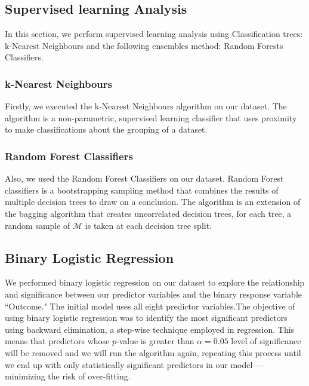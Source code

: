 \documentclass[12pt]{article}
\begin{document}
\subsection{Supervised learning Analysis} 
 In this section, we perform supervised learning analysis using Classification trees: k-Nearest Neighbours and the following ensembles method: Random Forests Classifiers.\cite{zhou2012ensemble}
 
 \subsubsection{k-Nearest Neighbours}

 Firstly, we executed the k-Nearest Neighbours algorithm \cite{peterson2009k} on our dataset. The algorithm is a non-parametric, supervised learning classifier that uses proximity to make classifications about the grouping of a dataset.

 \subsubsection{Random Forest Classifiers}
 
 Also, we used the Random Forest Classifiers \cite{zhou2012ensemble} on our dataset. Random Forest classifiers is a bootstrapping sampling method that combines the results of multiple decision trees to draw on a conclusion. The algorithm \cite{Lecture16} is an extension of the bagging algorithm \cite{Lecture16} that creates uncorrelated decision trees, for each tree, a random sample of $\mathcal{M}$ is taken at each decision tree split.

\subsection{Binary Logistic Regression}

\begin{indent}
	

We performed binary logistic regression \cite{faraway2016extending} on our dataset to explore the relationship and significance between our predictor variables and the binary response variable “Outcome." The initial model uses all eight predictor variables.The objective of using binary logistic regression was to identify the most significant predictors using backward elimination, a step-wise technique employed in regression. This means that predictors whose $p$-value is greater than $\alpha = 0.05$ level of significance will be removed and we will run the algorithm again, repeating this process until we end up with only statistically significant predictors in our model --- minimizing the risk of over-fitting. 

\end{indent}
\end{document}
